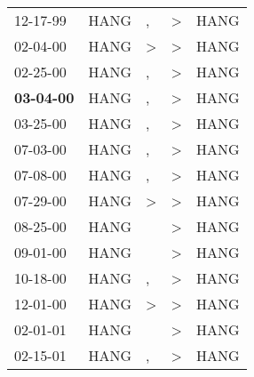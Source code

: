 \begin{supertabular}{p{0.07\textwidth}p{0.06\textwidth}p{0.02\textwidth}p{0.02\textwidth}p{0.06\textwidth}}
          12-17-99\textsuperscript{} &           HANG\textsuperscript{} &                , &     \textgreater &           HANG\textsuperscript{} \\
          02-04-00\textsuperscript{} &           HANG\textsuperscript{} &     \textgreater &     \textgreater &           HANG\textsuperscript{} \\
          02-25-00\textsuperscript{} &           HANG\textsuperscript{} &                , &     \textgreater &           HANG\textsuperscript{} \\
 \textbf{03-04-00\textsuperscript{}} &           HANG\textsuperscript{} &                , &     \textgreater &           HANG\textsuperscript{} \\
          03-25-00\textsuperscript{} &           HANG\textsuperscript{} &                , &     \textgreater &           HANG\textsuperscript{} \\
          07-03-00\textsuperscript{} &           HANG\textsuperscript{} &                , &     \textgreater &           HANG\textsuperscript{} \\
          07-08-00\textsuperscript{} &           HANG\textsuperscript{} &                , &     \textgreater &           HANG\textsuperscript{} \\
          07-29-00\textsuperscript{} &           HANG\textsuperscript{} &     \textgreater &     \textgreater &           HANG\textsuperscript{} \\
          08-25-00\textsuperscript{} &           HANG\textsuperscript{} &                  &     \textgreater &           HANG\textsuperscript{} \\
          09-01-00\textsuperscript{} &           HANG\textsuperscript{} &                  &     \textgreater &           HANG\textsuperscript{} \\
          10-18-00\textsuperscript{} &           HANG\textsuperscript{} &                , &     \textgreater &           HANG\textsuperscript{} \\
          12-01-00\textsuperscript{} &           HANG\textsuperscript{} &     \textgreater &     \textgreater &           HANG\textsuperscript{} \\
          02-01-01\textsuperscript{} &           HANG\textsuperscript{} &                  &     \textgreater &           HANG\textsuperscript{} \\
          02-15-01\textsuperscript{} &           HANG\textsuperscript{} &                , &     \textgreater &           HANG\textsuperscript{} \\

\end{supertabular}
